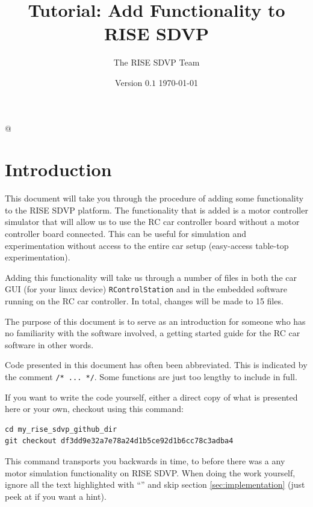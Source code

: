 \documentclass[12pt]{article} %
\newcommand{\GUIDEVERSION}[0]{$0.1$}
\newcommand{\GUIDETITLE}[0]{Tutorial: Add Functionality to RISE SDVP}
\newcommand{\change}[0]{\noindent{\hl {\b CODE CHANGE:}}}
\begin{document}
\title{\GUIDETITLE}


\author{The RISE SDVP Team}



\date{Version \GUIDEVERSION{} \today}




\lstMakeShortInline[]@


\maketitle


\section{Introduction}

This document will take you through the procedure of adding some
functionality to the RISE SDVP platform. The functionality that is
added is a motor controller simulator that will allow us to use the RC
car controller board without a motor controller board connected. This
can be useful for simulation and experimentation without access to the
entire car setup (easy-access table-top experimentation).

Adding this functionality will take us through a number of files in both
the car GUI (for your linux device) {\verb!RControlStation!} and in the
embedded software running on the RC car controller. In total, changes
will be made to 15 files.

The purpose of this document is to serve as an introduction for
someone who has no familiarity with the software involved, a getting
started guide for the RC car software in other words.

Code presented in this document has often been abbreviated. This
is indicated by the comment {\verb!/* ... */!}. Some functions are
just too lengthy to include in full.

If you want to write the code yourself, either a direct copy of what is
presented here or your own, checkout using this command:

\begin{verbatim}
cd my_rise_sdvp_github_dir
git checkout df3dd9e32a7e78a24d1b5ce92d1b6cc78c3adba4
\end{verbatim}

This command transports you backwards in time, to before there was a
any motor simulation functionality on RISE SDVP. When doing the
work yourself, ignore all the text highlighted with ``\change{}'' and
skip section \ref{sec:implementation} (just peek at if you want a hint).
      
\end{document}

